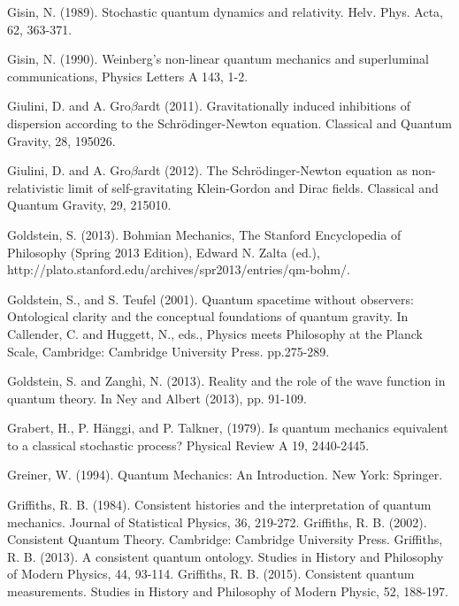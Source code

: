\begin{thebibliography}{}

\bibitem{} Gisin, N. (1989). Stochastic quantum dynamics and relativity. Helv. Phys. Acta, 62, 363-371.

\bibitem{} Gisin, N. (1990). Weinberg's non-linear quantum mechanics and superluminal communications, Physics Letters A 143, 1-2.

\bibitem{}  Giulini, D. and A. Gro$\beta$ardt (2011). Gravitationally induced inhibitions of dispersion according to the Schr\"{o}dinger-Newton equation. Classical and Quantum Gravity, 28, 195026.

\bibitem{} Giulini, D. and A. Gro$\beta$ardt (2012). The Schr\"{o}dinger-Newton equation as non-relativistic limit of self-gravitating Klein-Gordon and Dirac fields. Classical and Quantum Gravity, 29, 215010.

\bibitem{} Goldstein, S. (2013). Bohmian Mechanics, The Stanford Encyclopedia of Philosophy (Spring 2013 Edition), Edward N. Zalta (ed.), http://plato.stanford.edu/archives/spr2013/entries/qm-bohm/.

\bibitem{} Goldstein, S., and S. Teufel (2001). Quantum spacetime without observers: Ontological clarity and the conceptual foundations of quantum gravity. In Callender, C. and Huggett, N., eds., Physics meets Philosophy at the Planck Scale, Cambridge: Cambridge University Press. pp.275-289.

\bibitem{}  Goldstein, S.  and Zangh\`{i}, N. (2013). Reality and the role of the wave function in quantum theory. In Ney and Albert (2013), pp. 91-109.

\bibitem{} Grabert, H., P. H\"{a}nggi, and P. Talkner,  (1979). Is quantum mechanics equivalent to a classical stochastic process? Physical Review A 19, 2440-2445.

\bibitem{} Greiner, W. (1994). Quantum Mechanics: An Introduction. New York: Springer.

\bibitem{} Griffiths, R. B. (1984). Consistent histories and the interpretation of quantum mechanics. Journal of Statistical Physics, 36, 219-272.
\bibitem{} Griffiths, R. B. (2002). Consistent Quantum Theory. Cambridge: Cambridge University Press.
\bibitem{} Griffiths, R. B. (2013). A consistent quantum ontology. Studies in History and Philosophy of Modern Physics, 44, 93-114.
\bibitem{} Griffiths, R. B. (2015). Consistent quantum measurements. Studies in History and Philosophy of Modern Physic, 52, 188-197.


\end{thebibliography}
